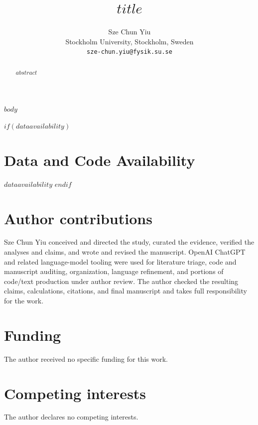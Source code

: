 \documentclass[11pt]{article}
\title{$title$}
\author{Sze Chun Yiu\\Stockholm University, Stockholm, Sweden\\\texttt{sze-chun.yiu@fysik.su.se}}
\date{}
\begin{document}
\maketitle

\begin{abstract}
$abstract$
\end{abstract}

$body$

$if(dataavailability)$
\section*{Data and Code Availability}
$dataavailability$
$endif$

\section*{Author contributions}
Sze Chun Yiu conceived and directed the study, curated the evidence, verified the
analyses and claims, and wrote and revised the manuscript. OpenAI ChatGPT and
related language-model tooling were used for literature triage, code and
manuscript auditing, organization, language refinement, and portions of code/text
production under author review. The author checked the resulting claims,
calculations, citations, and final manuscript and takes full responsibility for
the work.

\section*{Funding}
The author received no specific funding for this work.

\section*{Competing interests}
The author declares no competing interests.



\end{document}
